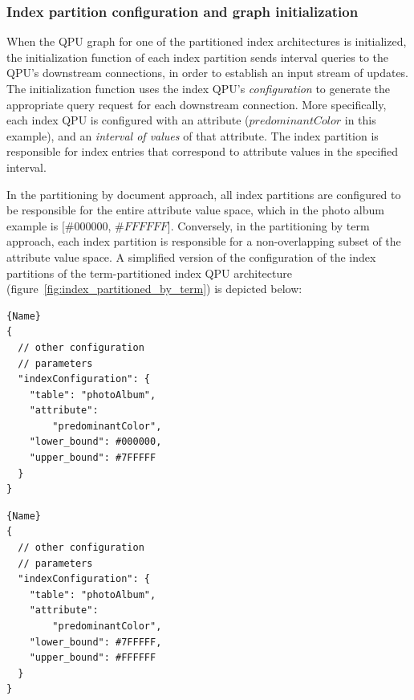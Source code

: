 \subsubsection{Index partition configuration and graph initialization}

When the QPU graph for one of the partitioned index architectures is initialized,
the initialization function of each index partition sends interval queries to the QPU's downstream connections,
in order to establish an input stream of updates.
The initialization function uses the index QPU's \textit{configuration} to generate the appropriate query request for each
downstream connection.
More specifically, each index QPU is configured with an attribute ($predominantColor$ in this example),
and an \textit{interval of values} of that attribute.
The index partition is responsible for index entries that correspond to attribute values in the specified interval.

\medskip
\noindent
In the partitioning by document approach,
all index partitions are configured to be responsible for the entire attribute value space,
which in the photo album example is $[\#000000$, $\#FFFFFF$].
Conversely, in the partitioning by term approach, each index partition is responsible for a non-overlapping subset of the
attribute value space.
A simplified version of the configuration of the index partitions of the term-partitioned index QPU architecture
(figure~\ref{fig:index_partitioned_by_term}) is depicted below: \\

\begin{minipage}{.48\textwidth}
\begin{lstlisting}[caption={Configuration of $index_1$ in Figure~\ref{fig:index_partitioned_by_term}},captionpos=b,frame=tlrb]{Name}
{
  // other configuration
  // parameters
  "indexConfiguration": {
    "table": "photoAlbum",
    "attribute":
        "predominantColor",
    "lower_bound": #000000,
    "upper_bound": #7FFFFF
  }
}
\end{lstlisting}
\end{minipage}\hfill
\begin{minipage}{.48\textwidth}
\begin{lstlisting}[caption={Configuration of $index_2$ in Figure~\ref{fig:index_partitioned_by_term}},captionpos=b,frame=tlrb]{Name}
{
  // other configuration
  // parameters
  "indexConfiguration": {
    "table": "photoAlbum",
    "attribute":
        "predominantColor",
    "lower_bound": #7FFFFF,
    "upper_bound": #FFFFFF
  }
}
\end{lstlisting}
\end{minipage}

